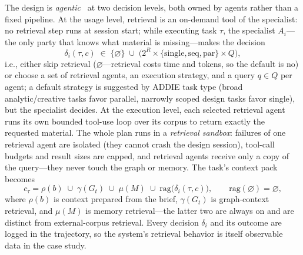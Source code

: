 The design is \emph{agentic}~\cite{lewis2020rag,singh2025agenticrag} at two decision levels, both owned by agents rather than a fixed pipeline. At the usage level, retrieval is an on-demand tool of the specialist: no retrieval step runs at session start; while executing task $\tau$, the specialist $A_i$---the only party that knows what material is missing---makes the decision
\[
\delta_i(\tau, c) \;\in\; \{\varnothing\} \;\cup\; \big(2^R \times \{\text{single}, \text{seq}, \text{par}\} \times Q\big),
\]
i.e., either skip retrieval ($\varnothing$---retrieval costs time and tokens, so the default is no) or choose a set of retrieval agents, an execution strategy, and a query $q \in Q$ per agent; a default strategy is suggested by ADDIE task type (broad analytic/creative tasks favor parallel, narrowly scoped design tasks favor single), but the specialist decides. At the execution level, each selected retrieval agent runs its own bounded tool-use loop over its corpus to return exactly the requested material. The whole plan runs in a \emph{retrieval sandbox}: failures of one retrieval agent are isolated (they cannot crash the design session), tool-call budgets and result sizes are capped, and retrieval agents receive only a copy of the query---they never touch the graph or memory. The task's context pack becomes
\[
c_\tau = \rho(b) \;\cup\; \gamma(G_t) \;\cup\; \mu(M) \;\cup\; \mathrm{rag}\big(\delta_i(\tau, c)\big), \qquad \mathrm{rag}(\varnothing) = \varnothing,
\]
where $\rho(b)$ is context prepared from the brief, $\gamma(G_t)$ is graph-context retrieval, and $\mu(M)$ is memory retrieval---the latter two are always on and are distinct from external-corpus retrieval. Every decision $\delta_i$ and its outcome are logged in the trajectory, so the system's retrieval behavior is itself observable data in the case study.

